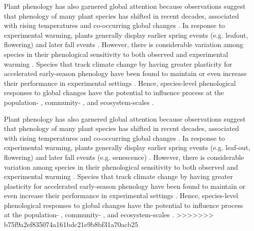 \documentclass[11pt]{article}
\begin{document}
Plant phenology has also garnered global attention because observations suggest that phenology of many plant species has shifted in recent decades, associated with rising temperatures and co-occurring global changes \citep{wolkovich2012warming,parmesan2015plants,menzel2020climate}. In response to experimental warming, plants generally display earlier spring events (e.g. leafout, flowering) and later fall events  \citep[e.g. senescence][]{stuble2021plant}. However, there is considerable variation among species in their phenological sensitivity to both observed and experimental warming \citep{cook2012divergent,wolkovich2012warming}. Species that track climate change by having greater plasticity for accelerated early-season phenology have been found to maintain or even increase their performance in experimental settings \citep{cleland2012phenological,wolkovich2021phenological}. Hence, species-level phenological responses to global changes have the potential to influence process at the population- \citep{iler2021demographic}, community- \citep{cook2012divergent,caradonna2014shifts}, and ecosystem-scales \citep{piao2019plant} .

Plant phenology has also garnered global attention because observations suggest that phenology of many plant species has shifted in recent decades, associated with rising temperatures and co-occurring global changes \citep{wolkovich2012warming,parmesan2015plants,menzel2020climate}. In response to experimental warming, plants generally display earlier spring events (e.g. leaf-out, flowering) and later fall events (e.g. senescence) \citep{stuble2021plant}. However, there is considerable variation among species in their phenological sensitivity to both observed and experimental warming \citep{cook2012divergent,wolkovich2012warming,konig2018advances}. Species that track climate change by having greater plasticity for accelerated early-season phenology have been found to maintain or even increase their performance in experimental settings \citep{cleland2012phenological,wolkovich2021phenological}. Hence, species-level phenological responses to global changes have the potential to influence process at the population- \citep{iler2021demographic}, community- \citep{cook2012divergent,caradonna2014shifts}, and ecosystem-scales \citep{piao2019plant} .
>>>>>>> b75f9a2ef835074a161bdc21e9b8bf31a70acb25
\end{document}
